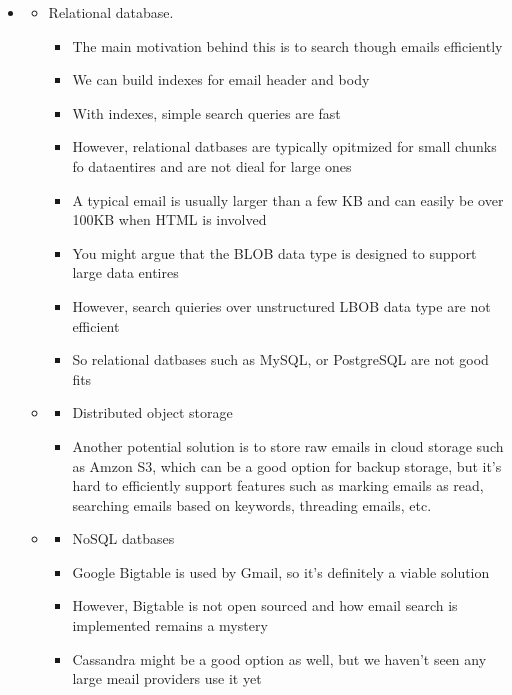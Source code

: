 \documentclass{report}
\theoremstyle{definition}
\begin{document}
\begin{itemize}
\item

\begin{itemize}
\item
Relational database.

\begin{itemize}
\item
The main motivation behind this is to search though emails efficiently
\item
We can build indexes for email header and body
\item
With indexes, simple search queries are fast
\item
However, relational datbases are typically opitmized for small chunks fo dataentires and are not dieal for large ones
\item
A typical email is usually larger than a few KB and can easily be over 100KB when HTML is involved
\item
You might argue that the BLOB data type is designed to support large data entires
\item
However, search quieries over unstructured LBOB data type are not efficient
\item
So relational datbases such as MySQL, or PostgreSQL are not good fits
\end{itemize}

\item

\begin{itemize}
\item
Distributed object storage
\item
Another potential solution is to store raw emails in cloud storage such as Amzon S3,  which can be a good option for backup storage, but it's hard to efficiently support features such as marking emails as read, searching emails based on keywords, threading emails, etc.
\end{itemize}

\item

\begin{itemize}
\item
NoSQL datbases
\item
Google Bigtable is used by Gmail, so it's definitely a viable solution
\item
However, Bigtable is not open sourced and how email search is implemented remains a mystery
\item
Cassandra might be a good option as well, but we haven't seen any large meail providers use it yet
\end{itemize}
\end{itemize}
\end{itemize}
\end{document}
